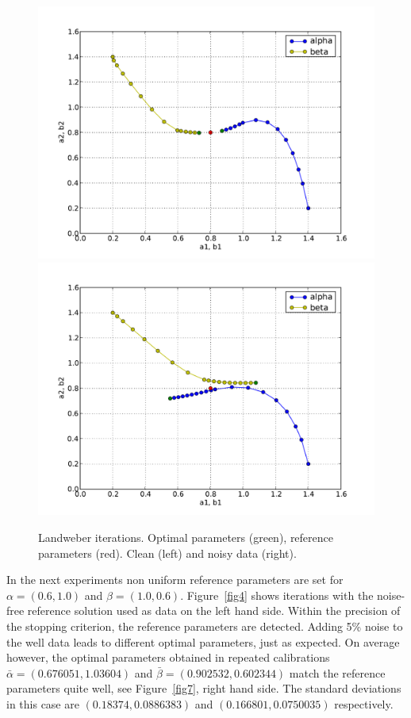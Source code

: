 \begin{figure}
  \begin{center}
    \includegraphics[width=\smallfig]{chapters/schroll/pdf/4Dscan3.pdf}
    \includegraphics[width=\smallfig]{chapters/schroll/pdf/4Dscan3-5.pdf}
    \vspace{-0.7cm}
    \caption{Landweber iterations. Optimal parameters (green), reference
    parameters (red). Clean (left) and noisy data (right).}
    \label{fig3}
  \end{center}
\end{figure}

In the next experiments non uniform reference parameters are set for
$\alpha = (0.6, 1.0)$ and $\beta = (1.0, 0.6)$.  Figure~\ref{fig4}
shows iterations with the noise-free reference solution used as data
on the left hand side.  Within the precision of the stopping
criterion, the reference parameters are detected.  Adding 5\% noise to
the well data leads to different optimal parameters, just as expected.
On average however, the optimal parameters obtained in repeated
calibrations $\bar\alpha=(0.676051, 1.03604)$ and
$\bar\beta=(0.902532, 0.602344)$ match the reference parameters quite
well, see Figure~\ref{fig7}, right hand side.  The standard deviations
in this case are $(0.18374, 0.0886383)$ and $(0.166801, 0.0750035)$
respectively.

